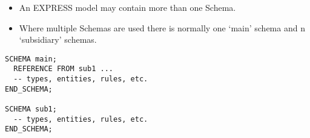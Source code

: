 \begin{itemize}
\item An EXPRESS model may contain more than one Schema.
\item Where multiple Schemas are used there is normally one `main' schema
and n `subsidiary' schemas.
\end{itemize}
\begin{verbatim}
SCHEMA main;
  REFERENCE FROM sub1 ...
  -- types, entities, rules, etc.
END_SCHEMA;

SCHEMA sub1;
  -- types, entities, rules, etc.
END_SCHEMA;
\end{verbatim}


\endinput


\vtitle{EXPRESS SUMMARY}

\begin{itemize}
\item A powerful OO information modeling language
  \begin{itemize}
  \item Primary form is a computer processible text language.
  \item EXPRESS-G as a graphical subset.
  \item EXPRESS-I as an instantiation form (in review).
  \item Extension to methods is planned.
  \end{itemize}
\item In ISO standardization process.
\item Normative STEP information models.
\item Becoming widely used in the modeling communities.
\item Software tools appearing.
\item User Group forming
\end{itemize}

\endinput
